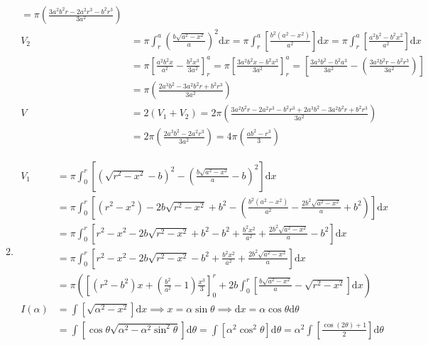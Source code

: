 \documentclass[12pt, A4]{report}
\renewcommand{\d}{\text{d}}
\begin{document}
\begin{enumerate}
\begin{enumerate}
\begin{align*}
										= \pi\left(\frac{3a^2b^2r - 2a^2r^3 - b^2r^3}{3a^2}\right) \\
								V_2 &= \pi\int_r^a\left(\frac{b\sqrt{a^2 - x^2}}{a}\right)^2\d x
										= \pi\int_r^a\left[\frac{b^2(a^2 - x^2)}{a^2}\right]\d x  = \pi\int_r^a\left[\frac{a^2b^2 - b^2x^2}{a^2}\right]\d x \\
									&= \pi\left[\frac{a^2b^2x}{a^2} - \frac{b^2x^3}{3a^2}\right]_r^a 
										= \pi\left[\frac{3a^2b^2x - b^2x^3}{3a^2}\right]_r^a 
										= \left[\frac{3a^3b^2 - b^2a^3}{3a^2} - \left(\frac{3a^2b^2r -b^2r^3}{3a^2}\right)\right] \\
									&= \pi\left(\frac{2a^3b^2 -3a^2b^2r + b^2r^3}{3a^2}\right) \\
								V &= 2(V_1 + V_2)
										= 2\pi\left(\frac{3a^2b^2r - 2a^2r^3 - b^2r^3 + 2a^3b^2 - 3a^2b^2r + b^2r^3}{3a^2}\right) \\
									&= 2\pi\left(\frac{2a^3b^2 - 2a^2r^3}{3a^2}\right) 
										= 4\pi\left(\frac{ab^2 - r^3}{3}\right)
							\end{align*}
						\item
 							\begin{align*}
								V_1 &= \pi\int_0^r\left[\left(\sqrt{r^2 - x^2} - b\right)^2 - \left(\frac{b\sqrt{a^2 - x^2}}{a} - b\right)^2\right]\d x \\
									&= \pi\int_0^r\left[(r^2 - x^2) - 2b\sqrt{r^2 - x^2} + b^2 - \left(\frac{b^2(a^2 - x^2)}{a^2} -\frac{2b^2\sqrt{a^2 - x^2}}{a} + b^2\right)\right]\d x \\
									&= \pi\int_0^r\left[r^2 - x^2 - 2b\sqrt{r^2 - x^2} + b^2 - b^2 +  \frac{b^2x^2}{a^2} + \frac{2b^2\sqrt{a^2 - x^2}}{a} - b^2\right]\d x \\
									&= \pi\int_0^r\left[r^2 - x^2 - 2b\sqrt{r^2 - x^2} - b^2 + \frac{b^2x^2}{a^2} + \frac{2b^2\sqrt{a^2 - x^2}}{a}\right]\d x \\
									&= \pi\left(\left[(r^2 - b^2)x + \left(\frac{b^2}{a^2} - 1 \right)\frac{x^3}{3}\right]_0^r + 2b\int_0^r\left[ \frac{b\sqrt{a^2 - x^2}}{a} - \sqrt{r^2 - x^2}\right]\d x\right) \\
								I(\alpha) &= \int\left[\sqrt{\alpha^2 - x^2}\right]\d x 
										\implies x = \alpha\sin\theta 
										\implies \d x = \alpha\cos\theta\d\theta \\
									&= \int\left[\cos\theta\sqrt{\alpha^2 - \alpha^2\sin^2\theta}\right]\d\theta
										= \int\left[\alpha^2\cos^2\theta\right]\d\theta
										= \alpha^2\int\left[\frac{\cos(2\theta) + 1}{2}\right]\d\theta \\

\end{align*}
\end{enumerate}
\end{enumerate}
\end{document}
